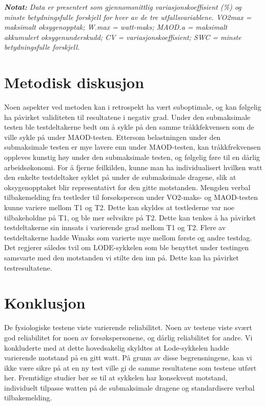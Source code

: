 \documentclass[
  letterpaper,
  DIV=11,
  numbers=noendperiod]{scrreprt}
\begin{document}
\emph{\textbf{Notat:} Data er presentert som gjennomsnittlig
variasjonskoeffisient (\%) og minste betydningsfulle forskjell for hver
av de tre utfallsvariablene. VO2max = maksimalt oksygenopptak; W.max =
watt-maks; MAOD.a = maksimalt akkumulert oksygenunderskudd; CV =
variasjonskoeffisient; SWC = minste betydningsfulle forskjell. }

\hypertarget{metodisk-diskusjon}{%
\section{Metodisk diskusjon}\label{metodisk-diskusjon}}

Noen aspekter ved metoden kan i retrospekt ha vært suboptimale, og kan
følgelig ha påvirket validiteten til resultatene i negativ grad. Under
den submaksimale testen ble testdeltakerne bedt om å sykle på den samme
tråkkfekvensen som de ville sykle på under MAOD-testen. Ettersom
belastningen under den submaksimale testen er mye lavere enn under
MAOD-testen, kan tråkkfrekvensen oppleves kunstig høy under den
submaksimale testen, og følgelig føre til en dårlig arbeidsøkonomi. For
å fjerne feilkilden, kunne man ha individualisert hvilken watt den
enkelte testdeltaker syklet på under de submaksimale dragene, slik at
oksygenopptaket blir representativt for den gitte motstanden. Mengden
verbal tilbakemelding fra testleder til forsøksperson under VO2-maks- og
MAOD-testen kunne variere mellom T1 og T2. Dette kan skyldes at
testlederne var noe tilbakeholdne på T1, og ble mer selvsikre på T2.
Dette kan tenkes å ha påvirket testdeltakerne sin innsats i varierende
grad mellom T1 og T2. Flere av testdeltakerne hadde Wmaks som varierte
mye mellom første og andre testdag. Det regjerer således tvil om
LODE-sykkelen som ble benyttet under testingen samsvarte med den
motstanden vi stilte den inn på. Dette kan ha påvirket testresultatene.

\hypertarget{konklusjon}{%
\section{Konklusjon}\label{konklusjon}}

De fysiologiske testene viste varierende reliabilitet. Noen av testene
viste svært god reliabilitet for noen av forsøkspersonene, og dårlig
reliabilitet for andre. Vi konkluderte med at dette hovedsakelig
skyldtes at Lode-sykkelen hadde varierende motstand på en gitt watt. På
grunn av disse begrensningene, kan vi ikke være sikre på at en ny test
ville gi de samme resultatene som testene utført her. Fremtidige studier
bør se til at sykkelen har konsekvent motstand, individuelt tilpasse
watten på de submaksimale dragene og standardisere verbal
tilbakemelding.
\end{document}
